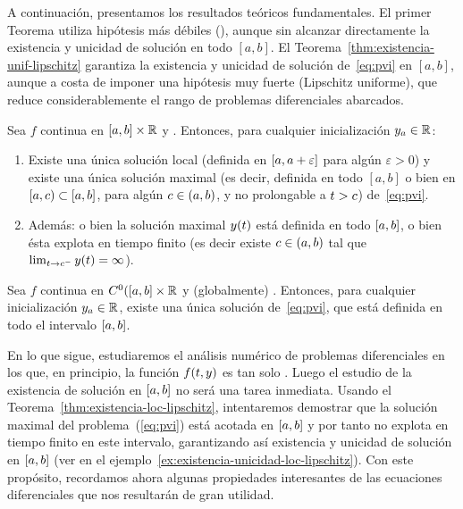 A continuación, presentamos los resultados teóricos fundamentales. El
primer Teorema utiliza hipótesis más débiles (\locLipschitz), aunque
sin alcanzar directamente la existencia y unicidad de solución en todo
$[a,b]$.  El Teorema~\ref{thm:existencia-unif-lipschitz} garantiza la
existencia y unicidad de solución de~\eqref{eq:pvi} en $[a,b]$,
aunque a costa de imponer una hipótesis muy fuerte (Lipschitz
uniforme), que reduce considerablemente el rango de problemas
diferenciales abarcados.
\begin{theorem}
  \label{thm:existencia-loc-lipschitz}
  Sea $f$ continua en $[\ta,\tb]\times\Rset$ y \locLipschitz. Entonces, para
  cualquier inicialización $\ycero\in\Rset$:
  \begin{enumerate}
  \item Existe una única solución local (definida en
    $[\ta,\ta+\varepsilon]$ para algún $\varepsilon>0$) y existe una
    única solución maximal (es decir, definida en todo $[a,b]$ o bien
    en $[\ta,c)\subset[\ta,\tb]$, para algún $c\in(\ta,\tb)$, y no
    prolongable a $\tt>c$) de~\eqref{eq:pvi}.
  \item Además: o bien la solución maximal $\sol(\tt)$  está definida en todo
    $[\ta,\tb]$, o bien ésta explota en tiempo finito (es decir existe
    $c\in (\ta,\tb)$ tal que $\lim_{\tt\to c^-} \sol(\tt) = \infty$).
  \end{enumerate}
\end{theorem}

\begin{theorem}[Picard]
  \label{thm:existencia-unif-lipschitz}
  Sea $f$ continua en $C^0([\ta,\tb]\times\Rset$ y (globalmente) \globLipschitz.
  Entonces, para cualquier inicialización $\ycero\in\Rset$, existe una
  única solución de~\eqref{eq:pvi}, que está definida en todo el
  intervalo $[\ta,\tb]$.%
\end{theorem}

En lo que sigue, estudiaremos el análisis numérico de problemas
diferenciales en los que, en principio, la función $f(\tt,y)$ es tan
solo \locLipschitz. Luego el estudio de la existencia de
solución en $[\ta,\tb]$ no será una tarea inmediata. Usando el
Teorema~\ref{thm:existencia-loc-lipschitz}, intentaremos demostrar que
la solución maximal del problema~(\ref{eq:pvi}) está acotada en
$[\ta,\tb]$ y por tanto no explota en tiempo finito en este intervalo,
garantizando así existencia y unicidad de solución en $[\ta,\tb]$ (ver
en el ejemplo~\ref{ex:existencia-unicidad-loc-lipschitz}). Con este
propósito, recordamos ahora algunas propiedades interesantes de las
ecuaciones diferenciales que nos resultarán de gran utilidad.

